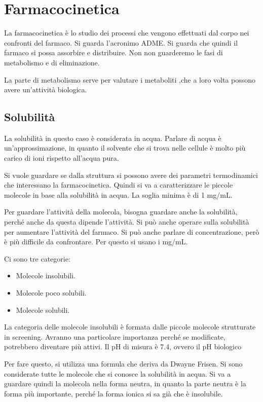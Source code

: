 \chapter{Farmacocinetica}

La farmacocinetica è lo studio dei processi che vengono effettuati dal corpo nei confronti
del farmaco.
Si guarda l'acronimo ADME. Si guarda che quindi il farmaco si
possa assorbire e distribuire. Non non guarderemo le fasi di metabolismo
e di eliminazione.

La parte di metabolismo serve per valutare i metaboliti ,che a loro
volta possono avere un'attività biologica.

\section{Solubilità}

La solubilità in questo caso è considerata in acqua. Parlare di acqua è un'approssimazione, in quanto il solvente
che si trova nelle cellule è molto più carico di ioni rispetto all'acqua
pura.

Si vuole guardare se dalla struttura si possono avere dei parametri
termodinamici che interessano la farmacocinetica.
Quindi si va a caratterizzare le piccole molecole in base alla
solubilità in acqua. La soglia minima è di 1 mg/mL.

Per guardare l'attività della molecola, bisogna guardare anche la
solubilità, perché anche da questa dipende l'attività. Si può anche
operare sulla solubilità per aumentare l'attività del farmaco.
Si può anche parlare di concentrazione, però è più difficile da
confrontare. Per questo si usano i mg/mL.

Ci sono tre categorie:
\begin{itemize}
  \item Molecole insolubili.
  \item Molecole poco solubili.
  \item Molecole solubili.
\end{itemize}

La categoria delle molecole insolubili è formata dalle piccole molecole strutturate in
screening. Avranno una particolare importanza perché se modificate,
potrebbero diventare più attivi.
Il pH di misura è 7.4, ovvero il pH biologico


Per fare questo, si utilizza una formula che deriva da Dwayne Frisen. Si
sono considerate tutte le molecole che si conosce la solubilità in
acqua. Si va a guardare quindi la molecola nella forma neutra, in quanto
la parte neutra è la forma più importante, perché la forma ionica si sa
già che è insolubile.


